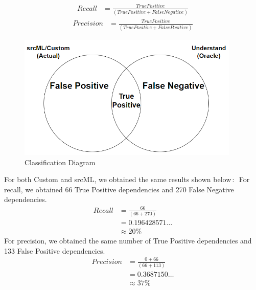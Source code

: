 \documentclass[12pt, dvipsnames, a4paper]{article}
\begin{document}
\begin{equation*}
	\begin{split}
		Recall &= \frac{True Positive}{(True Positive + False Negative)}
	\end{split}
\end{equation*}
\newline
\begin{equation*}
	\begin{split}
		Precision &= \frac{True Positive}{(True Positive + False Positive)}
	\end{split}
\end{equation*}

\begin{figure}[h]
	\center
	\includegraphics[width=300pt]{assets/recall_precision_diagram.PNG}
	\caption{Classification Diagram}
\end{figure}

For both Custom and srcML, we obtained the same results shown below$\,\colon\,$
\newline
For recall, we obtained 66 True Positive dependencies and 270 False Negative dependencies.
\begin{equation*}
	\begin{split}
		Recall &= \frac{66}{(66 + 270)}\\
		&= 0.196428571\dots\\
		&\approx 20\%
	\end{split}
\end{equation*}
For precision, we obtained the same number of True Positive dependencies and 133 False Positive dependencies.
\begin{equation*}
	\begin{split}
		Precision &= \frac{0 + 66}{(66 + 113)}\\
		&= 0.3687150\dots\\
		&\approx 37\%
	\end{split}
\end{equation*}
\clearpage
\end{document}
